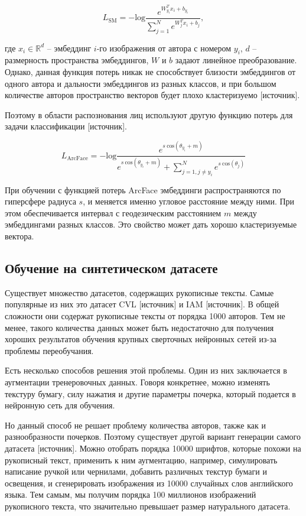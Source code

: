 $$
L_{\text{SM}} = -\text{log} \frac{e^{W_{y_i}^T x_i + b_{y_i}}}{\sum_{j=1}^{N} e^{W_{j}^T x_i + b_{j}}},
$$
\smallskip

\noindent
где $x_i \in \mathbb{R}^d$ -- эмбеддинг $i$-го изображения от автора с номером $y_i$, $d$ -- размерность пространства эмбеддингов, $W$ и $b$ задают линейное преобразование. Однако, данная функция потерь никак не способствует близости эмбеддингов от одного автора и дальности эмбеддингов из разных классов, и при большом количестве авторов пространство векторов будет плохо кластеризуемо [источник]. 

Поэтому в области распознования лиц используют другую функцию потерь для задачи классификации [источник]. 

$$
L_{\text{ArcFace}} = - \text{log} \frac{e^{s\:\text{cos}(\theta_{y_i} + m)}}
{e^{s\:\text{cos}(\theta_{y_i} + m)} + \sum^{N}_{j=1, j \neq y_i} e^{s\:\text{cos}(\theta_j)}}
$$
\smallskip

При обучении с функцией потерь ArcFace эмбеддинги распространяются по гиперсфере радиуса $s$, и меняется именно угловое расстояние между ними. При этом обеспечивается интервал с геодезическим расстоянием $m$ между эмбеддингами разных классов. Это свойство может дать хорошо кластеризуемые вектора.

\subsection{Обучение на синтетическом датасете}

Существует множество датасетов, содержащих рукописные тексты. Самые популярные из них это датасет CVL [источник] и IAM [источник]. В общей сложности они содержат рукописные тексты от порядка 1000 авторов. Тем не менее, такого количества данных может быть недостаточно для получения хороших результатов обучения крупных сверточных нейронных сетей из-за проблемы переобучания. 

Есть несколько способов решения этой проблемы. Один из них заключается в аугментации тренеровочных данных. Говоря конкретнее, можно изменять текстуру бумагу, силу нажатия и другие параметры почерка, который подается в нейронную сеть для обучения. 

Но данный способ не решает проблему количества авторов, также как и разнообразности почерков. Поэтому существует другой вариант генерации самого датасета [источник]. Можно отобрать порядка 10000 шрифтов, которые похожи на рукописный текст, применить к ним аугментацию, например, симулировать написание ручкой или чернилами, добавить различных текстур бумаги и освещения, и сгенерировать изображения из 10000 случайных слов английского языка. Тем самым, мы получим порядка 100 миллионов изображений рукописного текста, что значительно превышает размер натурального датасета.


